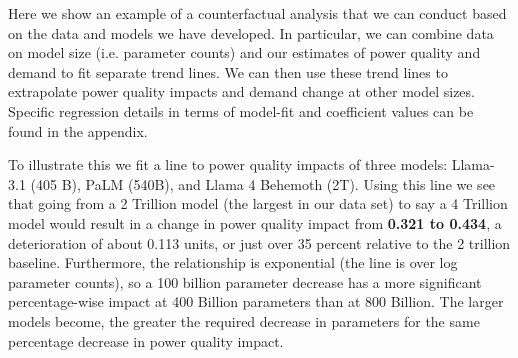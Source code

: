\documentclass[sigconf,authordraft]{acmart}
\begin{document}


Here we show an example of a counterfactual analysis that we can conduct based on the data and models we have developed. In particular, we can combine data on model size (i.e. parameter counts) and our estimates of power quality and demand to fit separate trend lines. We can then use these trend lines to extrapolate power quality impacts and demand change at other model sizes. Specific regression details in terms of model-fit and coefficient values can be found in the appendix.

To illustrate this we fit a line to power quality impacts of three models: Llama-3.1 (405 B), PaLM (540B), and Llama 4 Behemoth (2T). 
Using this line we see that going from a 2 Trillion model (the largest in our data set) to say a 4 Trillion model would result in a change in power quality impact from \textbf{0.321 to 0.434}, a deterioration of about 0.113 units, or just over 35 percent relative to the 2 trillion baseline. Furthermore, the relationship is exponential (the line is over log parameter counts), so a 100 billion parameter decrease has a more significant percentage-wise impact at 400 Billion parameters than at 800 Billion. The larger models become, the greater the required decrease in parameters for the same percentage decrease in power quality impact.
\end{document}
